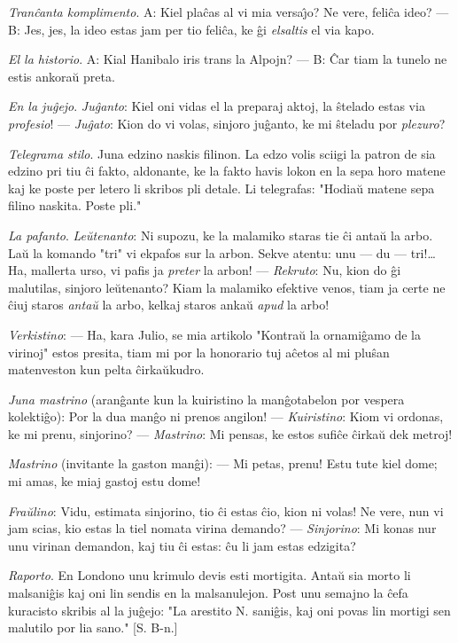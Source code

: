 \emph{Tran\^canta komplimento}. A: Kiel pla\^cas al vi mia
versa\^{\j}o? Ne vere, feli\^ca ideo? --- B: Jes, jes, la ideo estas
jam per tio feli\^ca, ke \^gi {\sl elsaltis} el via kapo.

\emph{El la historio}. A: Kial Hanibalo iris trans la Alpojn? --- B:
\^Car tiam la tunelo ne estis ankora\u u preta.

\emph{En la ju\^gejo}. {\sl Ju\^ganto}: Kiel oni vidas el la
preparaj aktoj, la \^stelado estas via {\sl profesio}! --- {\sl
Ju\^gato}: Kion do vi volas, sinjoro ju\^ganto, ke mi \^steladu por
{\sl plezuro}?

\emph{Telegrama stilo}. Juna edzino naskis filinon. La edzo volis
sciigi la patron de sia edzino pri tiu \^ci fakto, aldonante, ke la
fakto havis lokon en la sepa horo matene kaj ke poste per letero li
skribos pli detale. Li telegrafas: "Hodia\u u matene sepa filino
naskita. Poste pli."

\emph{La pafanto}. {\sl Le\u utenanto}: Ni supozu, ke la malamiko
staras tie \^ci anta\u u la arbo. La\u u la komando "tri" vi
ekpafos sur la arbon. Sekve atentu: unu --- du --- tri!\dots Ha,
mallerta urso, vi pafis ja {\sl preter} la arbon! --- {\sl Rekruto}:
Nu, kion do \^gi malutilas, sinjoro le\u utenanto? Kiam la malamiko
efektive venos, tiam ja certe ne \^ciuj staros {\sl anta\u u} la
arbo, kelkaj staros anka\u u {\sl apud} la arbo!

\emph{Verkistino}: --- Ha, kara Julio, se mia artikolo "Kontra\u u
la ornami\^gamo de la virinoj" estos presita, tiam mi por la
honorario tuj a\^cetos al mi plu\^san matenveston kun pelta
\^cirka\u ukudro.

\emph{Juna mastrino} (aran\^gante kun la kuiristino la
man\^gotabelon por vespera kolekti\^go): Por la dua man\^go ni
prenos angilon! --- {\sl Kuiristino}: Kiom vi ordonas, ke mi prenu,
sinjorino? --- {\sl Mastrino}: Mi pensas, ke estos sufi\^ce
\^cirka\u u dek metroj!

\emph{Mastrino} (invitante la gaston man\^gi): --- Mi petas, prenu!
Estu tute kiel dome; mi amas, ke miaj gastoj estu dome!

\emph{Fra\u ulino}: Vidu, estimata sinjorino, tio \^ci estas \^cio,
kion ni volas! Ne vere, nun vi jam scias, kio estas la tiel nomata
virina demando? --- {\sl Sinjorino}: Mi konas nur unu virinan
demandon, kaj tiu \^ci estas: \^cu li jam estas edzigita?

\emph{Raporto}. En Londono unu krimulo devis esti mortigita. Anta\u
u sia morto li malsani\^gis kaj oni lin sendis en la malsanulejon.
Post unu semajno la \^cefa kuracisto skribis al la ju\^gejo: "La
arestito N. sani\^gis, kaj oni povas lin mortigi sen malutilo por
lia sano." [S. B-n.]

